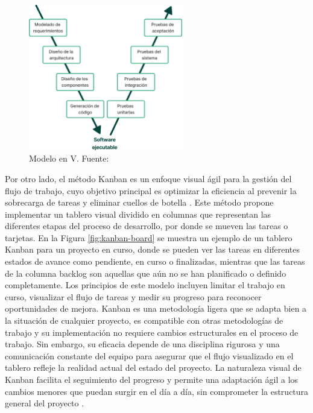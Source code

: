 \begin{figure}[!tb]
	\centering
	\includegraphics[width=0.6\textwidth]{Figures/model-v.png}
	\caption[Modelo en V]{Modelo en V. Fuente: \cite{pressman2010ingenieria}}
    \label{fig:model-v}
\end{figure}

Por otro lado, el método Kanban es un enfoque visual ágil para la gestión del flujo de trabajo, cuyo objetivo principal es optimizar la eficiencia al prevenir la sobrecarga de tareas y eliminar cuellos de botella \cite{alaidaros2021kanban}. Este método propone implementar un tablero visual dividido en columnas que representan las diferentes etapas del proceso de desarrollo, por donde se mueven las tareas o tarjetas. En la Figura \ref{fig:kanban-board} se muestra un ejemplo de un tablero Kanban para un proyecto en curso, donde se pueden ver las tareas en diferentes estados de avance como pendiente, en curso o finalizadas, mientras que las tareas de la columna backlog son aquellas que aún no se han planificado o definido completamente. Los principios de este modelo incluyen limitar el trabajo en curso, visualizar el flujo de tareas y medir su progreso para reconocer oportunidades de mejora. Kanban es una metodología ligera que se adapta bien a la situación de cualquier proyecto, es compatible con otras metodologías de trabajo y su implementación no requiere cambios estructurales en el proceso de trabajo. Sin embargo, su eficacia depende de una disciplina rigurosa y una comunicación constante del equipo para asegurar que el flujo visualizado en el tablero refleje la realidad actual del estado del proyecto. La naturaleza visual de Kanban facilita el seguimiento del progreso y permite una adaptación ágil a los cambios menores que puedan surgir en el día a día, sin comprometer la estructura general del proyecto \cite{alaidaros2021kanban}.

